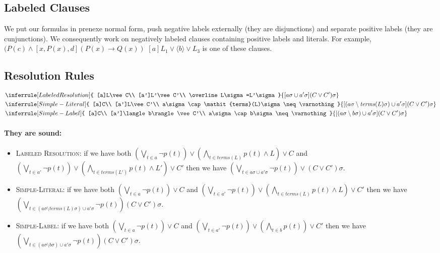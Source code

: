 \documentclass[a4paper,10pt]{report}
\newcommand{\terms}{\mathit{terms}}
\begin{document}
\subsection{Labeled Clauses}
We put our formulas in prenexe normal form, push negative labels externally (they are disjunctions) and
separate positive labels (they are cunjunctions). We consequently work on negatively labeled clauses 
containing positive labels and literals. For example, $(P(c)\wedge[x,P(x),d](P(x)\rightarrow Q(x))$
$[a]L_1\vee\langle b\rangle\vee L_3$ is one of
these clauses.
\subsection{Resolution Rules}
\begin{eqnarray*}
&
\inferrule [Labeled Resolution]{
[a]L\vee C\\ [a']L'\vee C'\\ \overline L\sigma=L'\sigma
}{
[a\sigma\cup a'\sigma](C\vee C')\sigma
}\\
&
\inferrule [Simple-Literal]{
[a]C\\ [a']L\vee C'\\ a\sigma\cap\terms(L)\sigma\neq\varnothing
}{
[(a\sigma\setminus\terms(L)\sigma)\cup a'\sigma](C \vee C')\sigma
}\\
&
\inferrule [Simple-Label]{
[a]C\\ [a']\langle b\rangle\vee C'\\ a\sigma\cap b\sigma\neq\varnothing
}{
[(a\sigma\setminus b\sigma)\cup a'\sigma](C \vee C')\sigma
}
\end{eqnarray*}
\paragraph{They are sound:}
\begin{itemize}
 \item \textsc{Labeled Resolution}:
 if we have both $(\bigvee_{t\in a}\neg p(t))\vee(\bigwedge_{t\in\terms(L)}p(t)\wedge L)\vee C$ and
$(\bigvee_{t\in a'}\neg p(t))\vee(\bigwedge_{t\in\terms(L')}p(t)\wedge L')\vee C'$ then
we have $(\bigvee_{t\in a\sigma\cup a'\sigma}\neg p(t))\vee(C\vee C')\sigma$.
 \item \textsc{Simple-Literal}:
 if we have both $(\bigvee_{t\in a}\neg p(t))\vee C$ and $(\bigvee_{t\in a'}\neg p(t))\vee
(\bigwedge_{t\in\terms(L)}p(t)\wedge L)\vee C'$ then
we have $(\bigvee_{t\in (a\sigma\setminus\terms(L)\sigma)\cup a'\sigma}\neg p(t))(C\vee C')\sigma$.
 \item \textsc{Simple-Label}:
 if we have both $(\bigvee_{t\in a}\neg p(t))\vee C$ and $(\bigvee_{t\in a'}\neg p(t))\vee
(\bigwedge_{t\in b}p(t))\vee C'$ then
we have $(\bigvee_{t\in (a\sigma\setminus b\sigma)\cup a'\sigma}\neg p(t))(C\vee C')\sigma$.
\end{itemize}
\end{document}
